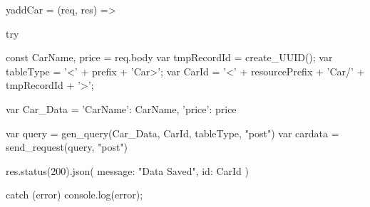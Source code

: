 yaddCar = (req, res) => {
    try {
        const { CarName, price } = req.body
        var tmpRecordId = create_UUID();
        var tableType = '<' + prefix + 'Car>';
        var CarId = '<' + resourcePrefix + 'Car/' + tmpRecordId + '>';

        var Car_Data = {
            'CarName': CarName,
            'price': price
        }

        var query = gen_query(Car_Data, CarId, tableType, "post")
        var cardata = send_request(query, "post")

        res.status(200).json({ message: "Data Saved", id: CarId })
    } catch (error) {
        console.log(error);
    }
}

